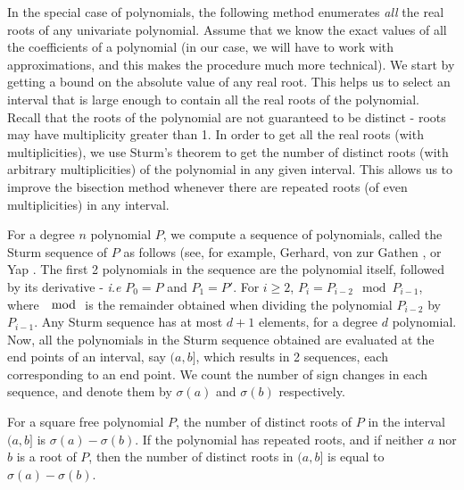 \documentclass[a4paper,UKenglish,cleveref,autoref,thm-restate]{lipics-v2021}
\begin{document}

In the special case of polynomials, the following method enumerates \emph{all} the real roots of any univariate polynomial. Assume that we know the exact values of all the coefficients of a polynomial (in our case, we will have to work with approximations, and this makes the procedure much more technical). We start by getting a bound on the absolute value of any real root. This helps us to select an interval that is large enough to contain all the real roots of the polynomial. Recall that the roots of the polynomial are not guaranteed to be distinct - roots may have multiplicity greater than 1. In order to get all the real roots (with multiplicities), we use Sturm's theorem to get the number of distinct roots (with arbitrary multiplicities) of the polynomial in any given interval. This allows us to improve the bisection method whenever there are repeated roots (of even multiplicities) in any interval. 

For a degree $n$ polynomial $P$, we compute a sequence of polynomials, called the Sturm sequence of $P$ as follows (see, for example, Gerhard, von zur Gathen \cite[Ch~2]{Gathen2013}, or Yap \cite[Ch~7]{Yap2000}. The first 2 polynomials in the sequence are the polynomial itself, followed by its derivative - \emph{i.e} $P_0 = P$ and $P_1=P'$. For $i\ge2$, $P_i=P_{i-2}\mod P_{i-1}$, where $\mod$ is the remainder obtained when dividing the polynomial $P_{i-2}$ by $P_{i-1}$. Any Sturm sequence has at most $d+1$ elements, for a degree $d$ polynomial. Now, all the polynomials in the Sturm sequence obtained are evaluated at the end points of an interval, say $(a,b]$, which results in 2 sequences, each corresponding to an end point. We count the number of sign changes in each sequence, and denote them by $\sigma(a)$ and $\sigma(b)$ respectively. 

\begin{theorem}\label{thm:sturm}
	For a square free polynomial $P$, the number of distinct roots of $P$ in the interval $(a,b]$ is $\sigma(a)-\sigma(b)$. If the polynomial has repeated roots, and if neither $a$ nor $b$ is a root of $P$, then the number of distinct roots in $(a,b]$ is equal to $\sigma(a)-\sigma(b)$. 
\end{theorem}
\end{document}
